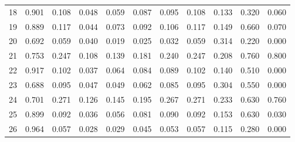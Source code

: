 \documentclass {article}
\begin{document}
\begin{table}[ht]
\begin{tabular}{rrrrrrrrrrr}
  18 & 0.901 & 0.108 & 0.048 & 0.059 & 0.087 & 0.095 & 0.108 & 0.133 & 0.320 & 0.060 \\ 
  19 & 0.889 & 0.117 & 0.044 & 0.073 & 0.092 & 0.106 & 0.117 & 0.149 & 0.660 & 0.070 \\ 
  20 & 0.692 & 0.059 & 0.040 & 0.019 & 0.025 & 0.032 & 0.059 & 0.314 & 0.220 & 0.000 \\ 
  21 & 0.753 & 0.247 & 0.108 & 0.139 & 0.181 & 0.240 & 0.247 & 0.208 & 0.760 & 0.800 \\ 
  22 & 0.917 & 0.102 & 0.037 & 0.064 & 0.084 & 0.089 & 0.102 & 0.140 & 0.510 & 0.000 \\ 
  23 & 0.688 & 0.095 & 0.047 & 0.049 & 0.062 & 0.085 & 0.095 & 0.304 & 0.550 & 0.000 \\ 
  24 & 0.701 & 0.271 & 0.126 & 0.145 & 0.195 & 0.267 & 0.271 & 0.233 & 0.630 & 0.760 \\ 
  25 & 0.899 & 0.092 & 0.036 & 0.056 & 0.081 & 0.090 & 0.092 & 0.153 & 0.630 & 0.030 \\ 
  26 & 0.964 & 0.057 & 0.028 & 0.029 & 0.045 & 0.053 & 0.057 & 0.115 & 0.280 & 0.000 \\ 
   \hline
\end{tabular}
\endgroup
\end{table}
\end{document}
